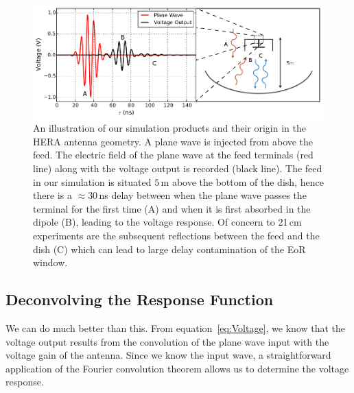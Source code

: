 \documentclass[twocolumn]{emulateapj}
\begin{document}
\begin{figure}
\includegraphics[width=\textwidth]{figures/SimulationIllustration.png}
\caption{An illustration of our simulation products and their origin in the HERA antenna geometry. A plane wave is injected from above the feed. The electric field of the plane wave at the feed terminals (red line) along with the voltage output is recorded (black line). The feed in our simulation is situated $5$\,m above the bottom of the dish, hence there is a $\approx 30$\,ns delay between when the plane wave passes the terminal for the first time (A) and when it is first absorbed in the dipole (B), leading to the voltage response. Of concern to 21\,cm experiments are the subsequent reflections between the feed and the dish (C) which can lead to large delay contamination of the EoR window.}
\label{fig:SimulationOutput}
\end{figure}
\subsection{Deconvolving the Response Function}\label{ssec:Deconvolve}

We can do much better than this. From equation~\ref{eq:Voltage}, we know that the voltage output results from the convolution of the plane wave input with the voltage gain of the antenna. Since we know the input wave, a straightforward application of the Fourier convolution theorem allows us to determine the voltage response.
\end{document}
